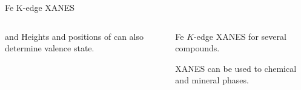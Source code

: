 \begin{slide}{Fe K-edge XANES}

  \begin{columns}[T]
    \begin{column}{57mm}
      {}

      \begin{minipage}{57mm}

        {} and
        Heights and positions of {} can also
        determine valence state. %

      \end{minipage}
    \end{column}
    \begin{column}{57mm}
      {}

      \begin{minipage}{57mm}

        Fe $K$-edge XANES for several compounds.

        XANES can be used to {} chemical and mineral
        phases.

      \end{minipage}

    \end{column}

  \end{columns}





\end{slide}
